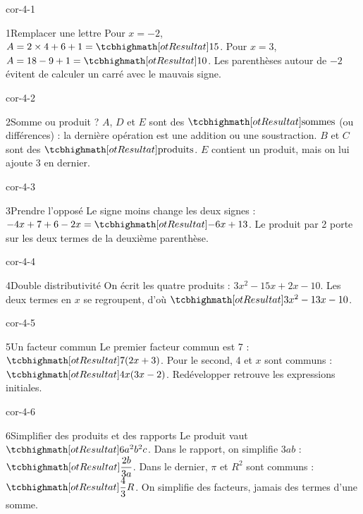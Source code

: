 \clearpage\pagestyle{otMain}\fontsize{11}{15}\selectfont{}
\begin{blocLivre}{cor-4-1}\begin{corrige}{1}{Remplacer une lettre}
Pour $x=-2$, $A=2\times4+6+1=\res{15}$. Pour $x=3$, $A=18-9+1=\res{10}$. Les parenthèses autour de $-2$ évitent de calculer un carré avec le mauvais signe.
\end{corrige}\end{blocLivre}
\begin{blocLivre}{cor-4-2}\begin{corrige}{2}{Somme ou produit ?}
$A$, $D$ et $E$ sont des $\res{\text{sommes}}$ (ou différences) : la dernière opération est une addition ou une soustraction. $B$ et $C$ sont des $\res{\text{produits}}$. $E$ contient un produit, mais on lui ajoute 3 en dernier.
\end{corrige}\end{blocLivre}
\begin{blocLivre}{cor-4-3}\begin{corrige}{3}{Prendre l’opposé}
Le signe moins change les deux signes : $-4x+7+6-2x=\res{-6x+13}$. Le produit par 2 porte sur les deux termes de la deuxième parenthèse.
\end{corrige}\end{blocLivre}
\begin{blocLivre}{cor-4-4}\begin{corrige}{4}{Double distributivité}
On écrit les quatre produits : $3x^2-15x+2x-10$. Les deux termes en $x$ se regroupent, d’où $\res{3x^2-13x-10}$.
\end{corrige}\end{blocLivre}
\begin{blocLivre}{cor-4-5}\begin{corrige}{5}{Un facteur commun}
Le premier facteur commun est 7 : $\res{7(2x+3)}$. Pour le second, 4 et $x$ sont communs : $\res{4x(3x-2)}$. Redévelopper retrouve les expressions initiales.
\end{corrige}\end{blocLivre}
\begin{blocLivre}{cor-4-6}\begin{corrige}{6}{Simplifier des produits et des rapports}
Le produit vaut $\res{6a^2b^2c}$. Dans le rapport, on simplifie $3ab$ : $\res{\dfrac{2b}{3a}}$. Dans le dernier, $\pi$ et $R^2$ sont communs : $\res{\dfrac43R}$. On simplifie des facteurs, jamais des termes d’une somme.
\end{corrige}\end{blocLivre}
